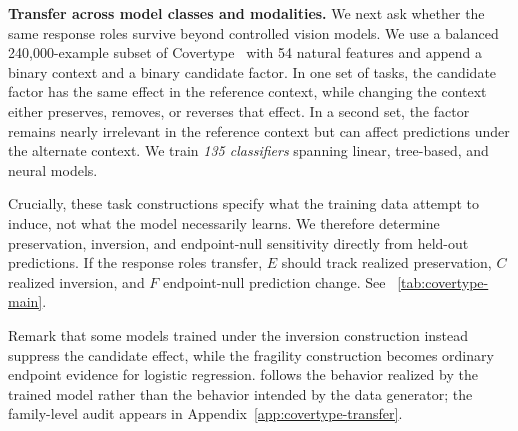 \textbf{Transfer across model classes and modalities.}
We next ask whether the same response roles survive beyond controlled vision models. We use a balanced 240,000-example subset of Covertype~\citep{blackard1998covertype} with 54 natural features and append a binary context and a binary candidate factor. In one set of tasks, the candidate factor has the same effect in the reference context, while changing the context either preserves, removes, or reverses that effect. In a second set, the factor remains nearly irrelevant in the reference context but can affect predictions under the alternate context. We train \emph{135 classifiers} spanning linear, tree-based, and neural models.

Crucially, these task constructions specify what the training data attempt to induce, not what the model necessarily learns. We therefore determine preservation, inversion, and endpoint-null sensitivity directly from held-out predictions. If the response roles transfer, $E$ should track realized preservation, $C$ realized inversion, and $F$ endpoint-null prediction change. See \tablename~\ref{tab:covertype-main}. 

Remark that some models trained under the inversion construction instead suppress the candidate effect, while the fragility construction becomes ordinary endpoint evidence for logistic regression. \decaf follows the behavior realized by the trained model rather than the behavior intended by the data generator; the family-level audit appears in Appendix~\ref{app:covertype-transfer}.

